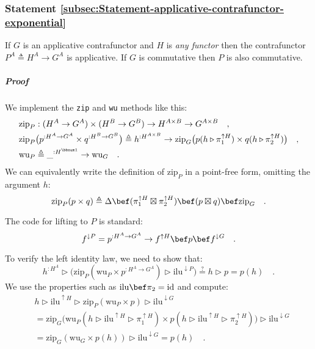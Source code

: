 \subsubsection{Statement \label{subsec:Statement-applicative-contrafunctor-exponential}\ref{subsec:Statement-applicative-contrafunctor-exponential}}

If $G$ is an applicative contrafunctor and $H$ is \emph{any functor}
then the contrafunctor $P^{A}\triangleq H^{A}\rightarrow G^{A}$ is
applicative. If $G$ is commutative then $P$ is also commutative.

\subparagraph{Proof}

We implement the \lstinline!zip! and \lstinline!wu! methods like
this:
\begin{align*}
 & \text{zip}_{P}:(H^{A}\rightarrow G^{A})\times(H^{B}\rightarrow G^{B})\rightarrow H^{A\times B}\rightarrow G^{A\times B}\quad,\\
 & \text{zip}_{P}\big(p^{:H^{A}\rightarrow G^{A}}\times q^{:H^{B}\rightarrow G^{B}}\big)\triangleq h^{:H^{A\times B}}\rightarrow\text{zip}_{G}\big(p(h\triangleright\pi_{1}^{\uparrow H})\times q(h\triangleright\pi_{2}^{\uparrow H})\big)\quad,\\
 & \text{wu}_{P}\triangleq\_^{:H^{\bbnum 1}}\rightarrow\text{wu}_{G}\quad.
\end{align*}
We can equivalently write the definition of $\text{zip}_{P}$ in a
point-free form, omitting the argument $h$:
\[
\text{zip}_{P}(p\times q)\triangleq\Delta\bef(\pi_{1}^{\uparrow H}\boxtimes\pi_{2}^{\uparrow H})\bef(p\boxtimes q)\bef\text{zip}_{G}\quad.
\]

The code for lifting to $P$ is standard:
\[
f^{\downarrow P}=p^{:H^{A}\rightarrow G^{A}}\rightarrow f^{\uparrow H}\bef p\bef f^{\downarrow G}\quad.
\]

To verify the left identity law, we need to show that:
\[
h^{:H^{A}}\triangleright\big(\text{zip}_{P}(\text{wu}_{P}\times p^{:H^{A}\rightarrow G^{A}})\triangleright\text{ilu}^{\downarrow P}\big)\overset{?}{=}h\triangleright p=p(h)\quad.
\]
We use the properties such as $\text{ilu}\bef\pi_{2}=\text{id}$ and
compute:
\begin{align*}
 & h\triangleright\text{ilu}^{\uparrow H}\triangleright\text{zip}_{P}(\text{wu}_{P}\times p)\triangleright\text{ilu}^{\downarrow G}\\
 & =\text{zip}_{G}\big(\text{wu}_{P}(h\triangleright\text{ilu}^{\uparrow H}\triangleright\pi_{1}^{\uparrow H})\times p(h\triangleright\text{ilu}^{\uparrow H}\triangleright\pi_{2}^{\uparrow H})\big)\triangleright\text{ilu}^{\downarrow G}\\
 & =\text{zip}_{G}(\text{wu}_{G}\times p(h))\triangleright\text{ilu}^{\downarrow G}=p(h)\quad.
\end{align*}

